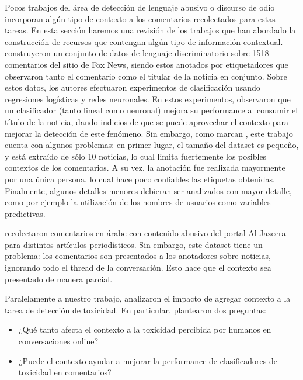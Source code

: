 Pocos trabajos del área de detección de lenguaje abusivo o discurso de odio incorporan algún tipo de contexto a los comentarios recolectados para estas tareas. En esta sección haremos una revisión de los trabajos que han abordado la construcción de recursos que contengan algún tipo de información contextual. \citet{gao-huang-2017-detecting} construyeron un conjunto de datos de lenguaje discriminatorio sobre 1518 comentarios del sitio de Fox News, siendo estos anotados por etiquetadores que observaron tanto el comentario como el titular de la noticia en conjunto. Sobre estos datos, los autores efectuaron experimentos de clasificación usando regresiones logísticas y redes neuronales. En estos experimentos, observaron que un clasificador (tanto lineal como neuronal) mejora su performance al consumir el título de la noticia, dando indicios de que se puede aprovechar el contexto para mejorar la detección de este fenómeno. Sin embargo, como marcan \citet{pavlopoulos2020toxicity}, este trabajo cuenta con algunos problemas: en primer lugar, el tamaño del dataset es pequeño, y está extraído de sólo 10 noticias, lo cual limita fuertemente los posibles contextos de los comentarios. A su vez, la anotación fue realizada mayormente por una única persona, lo cual hace poco confiables las etiquetas obtenidas. Finalmente, algunos detalles menores debieran ser analizados con mayor detalle, como por ejemplo la utilización de los nombres de usuarios como variables predictivas.

\citet{mubarak-etal-2017-abusive} recolectaron comentarios en árabe con contenido abusivo del portal Al Jazeera para distintos artículos periodísticos. Sin embargo, este dataset tiene un problema: los comentarios son presentados a los anotadores sobre noticias, ignorando todo el thread de la conversación. Esto hace que el contexto sea presentado de manera parcial.

Paralelamente a nuestro trabajo, \citet{pavlopoulos2020toxicity} analizaron el impacto de agregar contexto a la tarea de detección de toxicidad. En particular, plantearon dos preguntas:

\begin{itemize}
    \item ¿Qué tanto afecta el contexto a la toxicidad percibida por humanos en conversaciones online?
    \item ¿Puede el contexto ayudar a mejorar la performance de clasificadores de toxicidad en comentarios?
\end{itemize}

